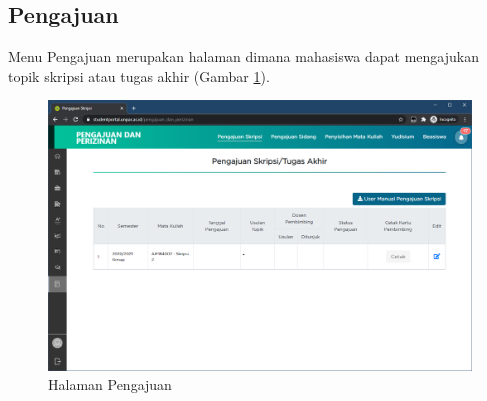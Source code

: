 \subsection{Pengajuan}
    Menu Pengajuan merupakan halaman dimana mahasiswa dapat mengajukan topik skripsi atau tugas akhir (Gambar \ref{fig:3_pengajuan}).
    \begin{figure}[H]
    	\centering
    	\includegraphics[scale=0.45]{Gambar/pengajuan.png}
    	\caption{Halaman Pengajuan} 
    	\label{fig:3_pengajuan}
    \end{figure}